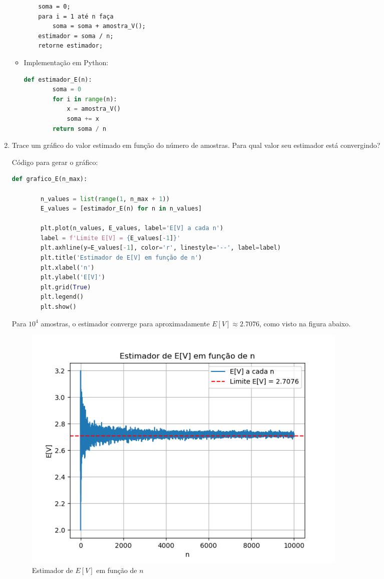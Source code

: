 \documentclass[12 pt]{article}
\begin{document}
\begin{enumerate}
\begin{tcolorbox}[colframe=black, title=Resposta:]
\begin{itemize}
\begin{verbatim}
    soma = 0;
    para i = 1 até n faça
        soma = soma + amostra_V();
    estimador = soma / n;
    retorne estimador;
            \end{verbatim}
            \item Implementação em Python:
            \begin{lstlisting}[language=Python]
    def estimador_E(n):
        soma = 0
        for i in range(n):
            x = amostra_V()
            soma += x
        return soma / n
            \end{lstlisting}
        \end{itemize}
    \end{tcolorbox}
    \item Trace um gráfico do valor estimado em função do número de amostras. Para qual valor seu estimador está convergindo?
    \begin{tcolorbox}[colframe=black, title=Resposta:]
        Código para gerar o gráfico:
        \begin{lstlisting}[language=Python]
    def grafico_E(n_max):
    
        n_values = list(range(1, n_max + 1))
        E_values = [estimador_E(n) for n in n_values]

        plt.plot(n_values, E_values, label='E[V] a cada n')
        label = f'Limite E[V] = {E_values[-1]}'
        plt.axhline(y=E_values[-1], color='r', linestyle='--', label=label)
        plt.title('Estimador de E[V] em função de n')
        plt.xlabel('n')
        plt.ylabel('E[V]')
        plt.grid(True)
        plt.legend()
        plt.show()
        \end{lstlisting}
        Para $10^4$ amostras, o estimador converge para aproximadamente $E[V] \approx 2.7076$, como visto na figura abaixo.
    \end{tcolorbox}

    \begin{figure}[H]
        \centering
        \includegraphics[width=0.8\textwidth]{q5_3.png}
        \caption{Estimador de $E[V]$ em função de $n$}
        \label{fig:estimador_E}
    \end{figure}
\end{enumerate}
\end{document}

